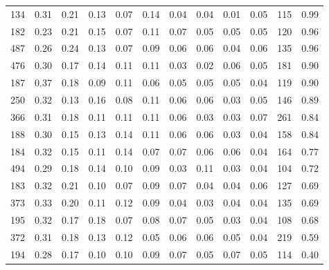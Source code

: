 \begin{tabular}{rrrrrrrrrrll}
          134 & 0.31 & 0.21 & 0.13 & 0.07 & 0.14 & 0.04 & 0.04 & 0.01 & 0.05 & 115 &  0.99 \\
          182 & 0.23 & 0.21 & 0.15 & 0.07 & 0.11 & 0.07 & 0.05 & 0.05 & 0.05 & 120 &  0.96 \\
          487 & 0.26 & 0.24 & 0.13 & 0.07 & 0.09 & 0.06 & 0.06 & 0.04 & 0.06 & 135 &  0.96 \\
          476 & 0.30 & 0.17 & 0.14 & 0.11 & 0.11 & 0.03 & 0.02 & 0.06 & 0.05 & 181 &  0.90 \\
          187 & 0.37 & 0.18 & 0.09 & 0.11 & 0.06 & 0.05 & 0.05 & 0.05 & 0.04 & 119 &  0.90 \\
          250 & 0.32 & 0.13 & 0.16 & 0.08 & 0.11 & 0.06 & 0.06 & 0.03 & 0.05 & 146 &  0.89 \\
          366 & 0.31 & 0.18 & 0.11 & 0.11 & 0.11 & 0.06 & 0.03 & 0.03 & 0.07 & 261 &  0.84 \\
          188 & 0.30 & 0.15 & 0.13 & 0.14 & 0.11 & 0.06 & 0.06 & 0.03 & 0.04 & 158 &  0.84 \\
          184 & 0.32 & 0.15 & 0.11 & 0.14 & 0.07 & 0.07 & 0.06 & 0.06 & 0.04 & 164 &  0.77 \\
          494 & 0.29 & 0.18 & 0.14 & 0.10 & 0.09 & 0.03 & 0.11 & 0.03 & 0.04 & 104 &  0.72 \\
          183 & 0.32 & 0.21 & 0.10 & 0.07 & 0.09 & 0.07 & 0.04 & 0.04 & 0.06 & 127 &  0.69 \\
          373 & 0.33 & 0.20 & 0.11 & 0.12 & 0.09 & 0.04 & 0.03 & 0.04 & 0.04 & 135 &  0.69 \\
          195 & 0.32 & 0.17 & 0.18 & 0.07 & 0.08 & 0.07 & 0.05 & 0.03 & 0.04 & 108 &  0.68 \\
          372 & 0.31 & 0.18 & 0.13 & 0.12 & 0.05 & 0.06 & 0.06 & 0.05 & 0.04 & 219 &  0.59 \\
          194 & 0.28 & 0.17 & 0.10 & 0.10 & 0.09 & 0.07 & 0.05 & 0.07 & 0.05 & 114 &  0.40 \\
\bottomrule
\end{tabular}
